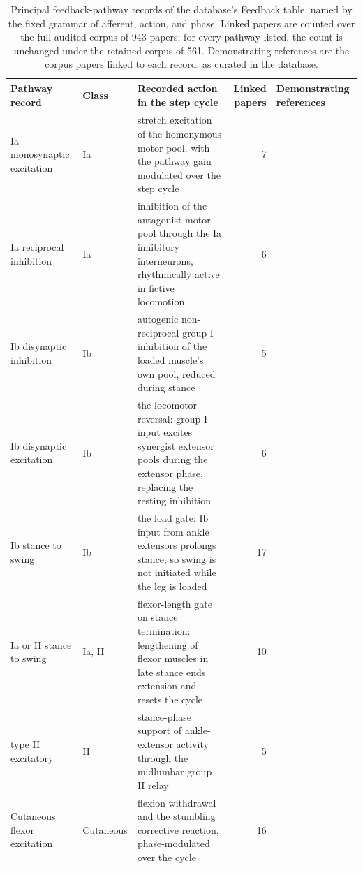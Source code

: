 \begin{table}
\caption{Principal feedback-pathway records of the database's Feedback table, named by the fixed grammar of afferent, action, and phase. Linked papers are counted over the full audited corpus of 943 papers; for every pathway listed, the count is unchanged under the retained corpus of 561. Demonstrating references are the corpus papers linked to each record, as curated in the database.}
\label{tab:sadb_pathways}
\fontsize{10pt}{12pt}\selectfont
\begin{tabularx}{\textheight}{@{}llXrp{0.26\textheight}@{}}
\toprule
\textbf{Pathway record} & \textbf{Class} & \textbf{Recorded action in the step cycle} & \textbf{Linked papers} & \textbf{Demonstrating references} \\
\midrule
Ia monosynaptic excitation & Ia & stretch excitation of the homonymous motor pool, with the pathway gain modulated over the step cycle & 7 & \citep{eccles_integrative_1958, capaday_amplitude_1986} \\
Ia reciprocal inhibition & Ia & inhibition of the antagonist motor pool through the Ia inhibitory interneurons, rhythmically active in fictive locomotion & 6 & \citep{jankowska_effect_1967, pratt_ia_1987} \\
Ib disynaptic inhibition & Ib & autogenic non-reciprocal group I inhibition of the loaded muscle's own pool, reduced during stance & 5 & \citep{jankowska_common_1981, stephens_short_1996} \\
Ib disynaptic excitation & Ib & the locomotor reversal: group I input excites synergist extensor pools during the extensor phase, replacing the resting inhibition & 6 & \citep{mccrea_disynaptic_1995, pearson_enhancement_1998} \\
Ib stance to swing & Ib & the load gate: Ib input from ankle extensors prolongs stance, so swing is not initiated while the leg is loaded & 17 & \citep{dietz_significance_2000, dominguez_candidate_2020} \\
Ia or II stance to swing & Ia, II & flexor-length gate on stance termination: lengthening of flexor muscles in late stance ends extension and resets the cycle & 10 & \citep{hiebert_contribution_1996, akay_degradation_2014} \\
type II excitatory & II & stance-phase support of ankle-extensor activity through the midlumbar group II relay & 5 & \citep{edgley_interneuronal_1987, mazzaro_afferent_2006} \\
Cutaneous flexor excitation & Cutaneous & flexion withdrawal and the stumbling corrective reaction, phase-modulated over the cycle & 16 & \citep{sherrington_flexion_1910, forssberg_stumbling_1979} \\
\bottomrule
\end{tabularx}
\end{table}
